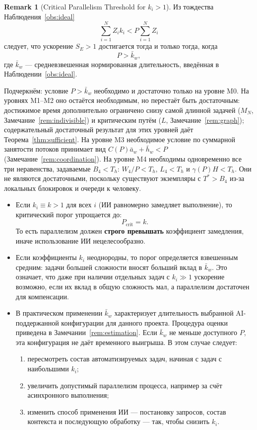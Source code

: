 \documentclass[12pt,a4paper]{article}
\theoremstyle{definition}
\newtheorem{remark}{Remark}
\begin{document}
\begin{remark}[Critical Parallelism Threshold for $k_i > 1$]\label{rem:threshold}
Из тождества Наблюдения~\ref{obs:ideal}
\[
  \sum_{i=1}^{N} Z_i k_i < P \sum_{i=1}^{N} Z_i
\]
следует, что ускорение $S_E > 1$ достигается тогда и только тогда, когда
\[
  P > \bar{k}_w,
\]
где $\bar{k}_w$ --- средневзвешенная нормированная длительность, введённая в Наблюдении~\ref{obs:ideal}.

Подчеркнём: условие $P > \bar{k}_w$ необходимо и достаточно только на уровне M0. На уровнях M1--M2 оно остаётся необходимым, но перестаёт быть достаточным: достижимое время дополнительно ограничено снизу самой длинной задачей ($M_N$, Замечание~\ref{rem:indivisible}) и критическим путём ($L$, Замечание~\ref{rem:graph}); содержательный достаточный результат для этих уровней даёт Теорема~\ref{thm:sufficient}. На уровне M3 необходимое условие по суммарной занятости потоков принимает вид $C(P)\bar a_w+\bar h_w<P$ (Замечание~\ref{rem:coordination}). На уровне M4 необходимы одновременно все три неравенства, задаваемые $B_4<T_h$: $W_4/P<T_h$, $L_4<T_h$ и $\gamma(P)H<T_h$. Они не являются достаточными, поскольку существуют экземпляры с $T^{*}>B_4$ из-за локальных блокировок и очереди к человеку.

\begin{itemize}
  \item Если $k_i \equiv k > 1$ для всех $i$ (ИИ равномерно замедляет выполнение), то критический порог упрощается до:
  \[
    P_{\text{crit}} = k.
  \]
  То есть параллелизм должен \textbf{строго превышать} коэффициент замедления, иначе использование ИИ нецелесообразно.

  \item Если коэффициенты $k_i$ неоднородны, то порог определяется взвешенным средним: задачи большей сложности вносят больший вклад в $\bar{k}_w$. Это означает, что даже при наличии отдельных задач с $k_i \gg 1$ ускорение возможно, если их вклад в общую сложность мал, а параллелизм достаточен для компенсации.

  \item В практическом применении $\bar{k}_w$ характеризует длительность выбранной AI-поддержанной конфигурации для данного проекта. Процедура оценки приведена в Замечании~\ref{rem:estimation}. Если $\bar{k}_w$ не меньше доступного $P$, эта конфигурация не даёт временного выигрыша. В этом случае следует:
  \begin{enumerate}
    \item пересмотреть состав автоматизируемых задач, начиная с задач с наибольшими $k_i$;
    \item увеличить допустимый параллелизм процесса, например за счёт асинхронного выполнения;
    \item изменить способ применения ИИ --- постановку запросов, состав контекста и последующую обработку --- так, чтобы снизить $k_i$.
  \end{enumerate}
\end{itemize}


\end{remark}
\end{document}
